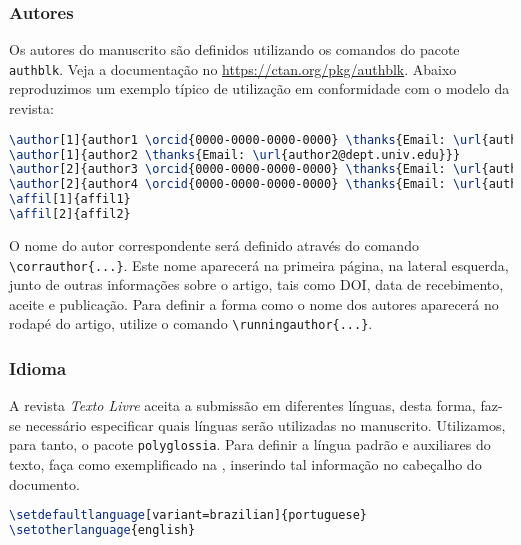 \documentclass{textolivre}
\begin{document}
\subsubsection{Autores}\label{sec-autores}
Os autores do manuscrito são definidos utilizando os comandos do pacote \verb|authblk|.
Veja a documentação no \href{CTAN}{https://ctan.org/pkg/authblk}. Abaixo reproduzimos um exemplo típico de utilização 
em conformidade com o modelo da revista:
 
\begin{lstlisting}[language=tex, label=lst-authors, caption={Definição dos autores do manuscrito.},postbreak=\mbox{$\hookrightarrow$\space}]
\author[1]{author1 \orcid{0000-0000-0000-0000} \thanks{Email: \url{author1@dept.univ.edu}}}
\author[1]{author2 \thanks{Email: \url{author2@dept.univ.edu}}}
\author[2]{author3 \orcid{0000-0000-0000-0000} \thanks{Email: \url{author3@inst.gov}}}
\author[2]{author4 \orcid{0000-0000-0000-0000} \thanks{Email: \url{author4@inst.gov}}}
\affil[1]{affil1}
\affil[2]{affil2}
\end{lstlisting} %

O nome do autor correspondente será definido através do comando \verb|\corrauthor{...}|. 
Este nome aparecerá na primeira página, na lateral esquerda, junto de outras informações sobre o artigo,
tais como DOI, data de recebimento, aceite e publicação. 
Para definir a forma como o nome dos autores aparecerá no rodapé do artigo, utilize o comando \verb|\runningauthor{...}|.

\subsubsection{Idioma}\label{sec-idioma}
A revista \emph{Texto Livre} aceita a submissão em diferentes línguas, desta forma, faz-se necessário especificar quais
línguas serão utilizadas no manuscrito. Utilizamos, para tanto, o pacote \verb|polyglossia|. Para definir
a língua padrão e auxiliares do texto, faça como exemplificado na , inserindo tal informação
no cabeçalho do documento.
\begin{lstlisting}[language=tex, label=lst-setlang, caption={Definição das línguas utilizadas no artigo.}]
\setdefaultlanguage[variant=brazilian]{portuguese}
\setotherlanguage{english}
\end{lstlisting} %
\end{document}
